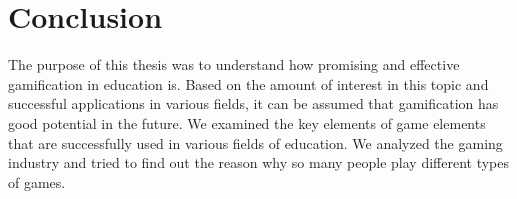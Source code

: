 \chapter{Conclusion}\label{ch:concl}
The purpose of this thesis was to understand how promising and effective gamification in education is. Based on the amount of interest in this topic and successful applications in various fields, it can be assumed that gamification has good potential in the future. We examined the key elements of game elements that are successfully used in various fields of education. We analyzed the gaming industry and tried to find out the reason why so many people play different types of games.